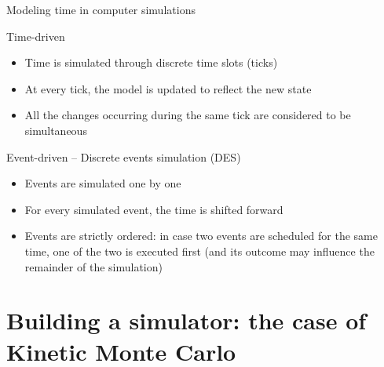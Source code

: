 \documentclass[presentation]{beamer}
\begin{document}
\begin{frame}{Modeling time in computer simulations}
	\begin{block}{Time-driven}
		\begin{itemize}
			\item Time is simulated through discrete time slots (ticks)
			\item At every tick, the model is updated to reflect the new state
			\item All the changes occurring during the same tick are considered to be simultaneous
		\end{itemize}
	\end{block}
	\begin{block}{Event-driven -- Discrete events simulation (DES)}
		\begin{itemize}
			\item Events are simulated one by one
			\item For every simulated event, the time is shifted forward
			\item Events are strictly ordered: in case two events are scheduled for the same time, one of the two is executed first (and its outcome may influence the remainder of the simulation)
		\end{itemize}
	\end{block}
\end{frame}

\section{Building a simulator: the case of Kinetic Monte Carlo}
\end{document}
